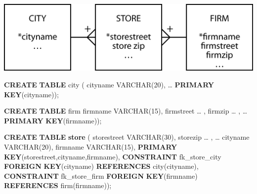 \documentclass[
]{article}
\newenvironment{Shaded}{\begin{snugshade}}{\end{snugshade}}
\newcommand{\DataTypeTok}[1]{\textcolor[rgb]{0.13,0.29,0.53}{#1}}
\newcommand{\DecValTok}[1]{\textcolor[rgb]{0.00,0.00,0.81}{#1}}
\newcommand{\KeywordTok}[1]{\textcolor[rgb]{0.13,0.29,0.53}{\textbf{#1}}}
\newcommand{\NormalTok}[1]{#1}
\begin{document}
\includegraphics[width=6.25in,height=\textheight]{Figures/Reference 1/r1-city-store-firm.png}

\begin{Shaded}
\begin{Highlighting}[]
\KeywordTok{CREATE} \KeywordTok{TABLE}\NormalTok{ city (}
\NormalTok{    cityname        }\DataTypeTok{VARCHAR}\NormalTok{(}\DecValTok{20}\NormalTok{),}
\NormalTok{    … }
        \KeywordTok{PRIMARY} \KeywordTok{KEY}\NormalTok{(cityname));}
\end{Highlighting}
\end{Shaded}

\begin{Shaded}
\begin{Highlighting}[]
\KeywordTok{CREATE} \KeywordTok{TABLE}\NormalTok{ firm }
\NormalTok{    firmname        }\DataTypeTok{VARCHAR}\NormalTok{(}\DecValTok{15}\NormalTok{),}
\NormalTok{    firmstreet      … ,}
\NormalTok{    firmzip     … ,}
\NormalTok{    …}
        \KeywordTok{PRIMARY} \KeywordTok{KEY}\NormalTok{(firmname));}
\end{Highlighting}
\end{Shaded}

\begin{Shaded}
\begin{Highlighting}[]
\KeywordTok{CREATE} \KeywordTok{TABLE} \KeywordTok{store}\NormalTok{ (}
\NormalTok{    storestreet }\DataTypeTok{VARCHAR}\NormalTok{(}\DecValTok{30}\NormalTok{), }
\NormalTok{    storezip        … ,}
\NormalTok{    …}
\NormalTok{    cityname        }\DataTypeTok{VARCHAR}\NormalTok{(}\DecValTok{20}\NormalTok{),}
\NormalTok{    firmname        }\DataTypeTok{VARCHAR}\NormalTok{(}\DecValTok{15}\NormalTok{),}
        \KeywordTok{PRIMARY} \KeywordTok{KEY}\NormalTok{(storestreet,cityname,firmname),}
        \KeywordTok{CONSTRAINT}\NormalTok{ fk\_store\_city}
            \KeywordTok{FOREIGN} \KeywordTok{KEY}\NormalTok{(cityname) }\KeywordTok{REFERENCES}\NormalTok{ city(cityname),}
        \KeywordTok{CONSTRAINT}\NormalTok{ fk\_store\_firm }
            \KeywordTok{FOREIGN} \KeywordTok{KEY}\NormalTok{(firmname) }\KeywordTok{REFERENCES}\NormalTok{ firm(firmname));}
\end{Highlighting}
\end{Shaded}
\end{document}
